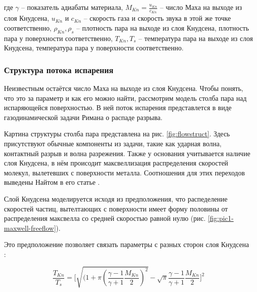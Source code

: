 \noindent
где $\gamma$ -- показатель адиабаты материала, $M_{Kn} = \frac{u_{Kn}}{c_{Kn}}$ -- число Маха на выходе из слоя Кнудсена, $u_{Kn}$ и $c_{Kn}$ -- скорость газа и скорость звука в этой же точке соответственно, $\rho_{Kn}, \rho_s$ -- плотность пара на выходе из слоя Кнудсена, плотность пара у поверхности соответственно, $ T_{Kn}, T_s$ -- температура пара на выходе из слоя Кнудсена, температура пара у поверхности соответственно.

\subsubsection{Структура потока испарения}

Неизвестным остаётся число Маха на выходе из слоя Кнудсена. Чтобы понять, что это за параметр и как его можно найти, рассмотрим модель столба пара над испаряющейся поверхностью. 
В ней поток испарения представлется в виде газодинамической задачи Римана о распаде разрыва.  

Картина структуры столба пара представлена на рис. \ref{fig:flowstruct}. Здесь присутствуют обычные компоненты из задачи, такие как ударная волна, контактный разрыв и волна разрежения. Также у основания учитывается наличие слоя Кнудсена, в нём происодит максвеллизация распределения скоростей молекул, вылетевших с поверхности металла. Соотношения для этих переходов выведены Найтом в его статье \cite{knight1979theoretical}.

Слой Кнудсена моделируется исходя из предположения, что распеделение скоростей частиц, вытелтающих с поверхности имеет форму половины от распределения максвелла со средней скоростью равной нулю (рис. \ref{fig:pic1-maxwell-freeflow}).



Это предположение позволяет связать параметры с разных сторон слоя Кнудсена \cite{knight1979theoretical}:

\begin{equation}
\label{eq:tempjump}
    \frac{T_{Kn}}{T_s} = \Bigg[ \sqrt{(1 + \pi \left( \frac{\gamma - 1}{\gamma + 1} \frac{M_{Kn}}{2} \right)^2} - \sqrt{\pi} \frac{\gamma - 1}{\gamma + 1} \frac{M_{Kn}}{2} \Bigg]^2
\end{equation}

